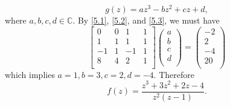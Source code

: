 \documentclass[12pt]{article}
\begin{document}
\[ g(z) = az^{3} - bz^{2} + cz + d, \]
where $a,b,c,d \in \mathbb{C}$. By \eqref{5.1}, \eqref{5.2}, and \eqref{5.3}, we must have
\[
\begin{bmatrix}
0 & 0 & 1 & 1 \\
1 & 1 & 1 & 1 \\
-1 & 1 & -1 & 1 \\
8 & 4 & 2 & 1 \\
\end{bmatrix}\left( \begin{array}{c}
a \\
b \\
c \\
d \\
\end{array} \right) = \left( \begin{array}{r}
-2 \\
2 \\
-4 \\
20 \\
\end{array} \right)
\]
which implies $a = 1, b = 3, c = 2, d = -4$. Therefore
\[ f(z) = \frac{z^{3} + 3z^{2} + 2z - 4}{z^{2}(z-1)}. \]


\newpage
\end{document}
